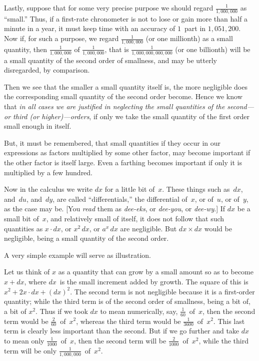 \documentclass[12pt]{book}[2005/09/16]
\newcommand{\DPPageSep}[2]{\Pagelabel{#2}}
\newcommand{\Pagelabel}[1]
  {\phantomsection\label{#1}}
\begin{document}
Lastly, suppose that for some very precise purpose
we should regard $\frac{1}{1,000,000}$ as ``small.'' Thus, if a
first-rate chronometer is not to lose or gain more than
half a minute in a year, it must keep time with an
accuracy of $1$~part in $1,051,200$. Now if, for such a
purpose, we regard $\frac{1}{1,000,000}$ (or one millionth) as a
small quantity, then $\frac{1}{1,000,000}$ of $\frac{1}{1,000,000}$, that is
$\frac{1}{1,000,000,000,000}$ (or one billionth) will be a small
quantity of the second order of smallness, and may
be utterly disregarded, by comparison.

Then we see that the smaller a small quantity itself
is, the more negligible does the corresponding small
quantity of the second order become. Hence we
know that \emph{in all cases we are justified in neglecting
the small quantities of the second---or third \emph{(or
higher)}---orders}, if only we take the small quantity
of the first order small enough in itself.

But, it must be remembered, that small quantities
if they occur in our expressions as factors multiplied
by some other factor, may become important if the
other factor is itself large. Even a farthing becomes
important if only it is multiplied by a few hundred.

Now in the calculus we write $dx$ for a little bit
of~$x$. These things such as~$dx$, and~$du$, and~$dy$, are
called ``differentials,'' the differential of~$x$, or of~$u$,
or of~$y$, as the case may be. [You \emph{read} them as
\emph{dee-eks}, or \emph{dee-you}, or \emph{dee-wy}.] If $dx$ be a small bit
of~$x$, and relatively small of itself, it does not follow
\DPPageSep{018.png}{6}%
that such quantities as $x · dx$, or $x^2\, dx$, or $a^x\, dx$ are
negligible. But $dx × dx$ would be negligible, being a
small quantity of the second order.

A very simple example will serve as illustration.

Let us think of $x$ as a quantity that can grow by
a small amount so as to become $x + dx$, where $dx$~is
the small increment added by growth. The square
of this is $x^2 + 2x · dx + (dx)^2$. The second term is
not negligible because it is a first-order quantity;
while the third term is of the second order of smallness,
being a bit of,
a bit of $x^2$. Thus if we took
$dx$ to mean numerically, say, $\frac{1}{60}$~of~$x$, then the second
term would be $\frac{2}{60}$~of~$x^2$, whereas the third term would
be $\frac{1}{3600}$~of~$x^2$. This last term is clearly less important
than the second. But if we go further and take
$dx$ to mean only $\frac{1}{1000}$~of~$x$, then the second term
will be $\frac{2}{1000}$~of~$x^2$, while the third term will be
only $\frac{1}{1,000,000}$~of~$x^2$.
\end{document}
